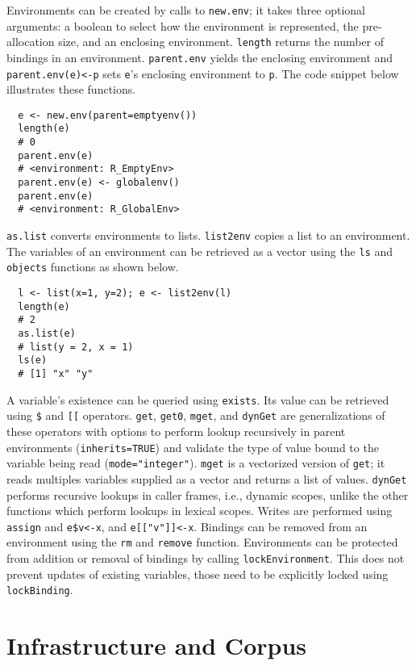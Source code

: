 \documentclass[10pt,sigplan,authorversion=true]{acmart}
\renewcommand{\c}[1]{\lstinline |#1|\xspace}
\newcommand{\newEnv}{\c{new.env}}
\newcommand{\asList}{\c{as.list}}
\newcommand{\listToEnv}{\c{list2env}}
\newcommand{\ls}{\c{ls}}
\newcommand{\objects}{\c{objects}}
\newcommand{\subDollar}{\c{$}}
\newcommand{\subBracket}{\c{[[}}
\newcommand{\exist}{\c{exists}}
\newcommand{\get}{\c{get}}
\newcommand{\getZero}{\c{get0}}
\newcommand{\mget}{\c{mget}}
\newcommand{\dynGet}{\c{dynGet}}
\newcommand{\assign}{\c{assign}}
\newcommand{\remove}{\c{remove}}
\renewcommand{\rm}{\c{rm}}
\newcommand{\lockEnvironment}{\c{lockEnvironment}}
\newcommand{\lockBinding}{\c{lockBinding}}
\newcommand{\parentEnv}{\c{parent.env}}
\begin{document}
Environments can be created by calls to \newEnv; it takes three optional
arguments: a boolean to select how the environment is represented, the
pre-allocation size, and an enclosing environment. \c{length} returns the number
of bindings in an environment. \parentEnv yields the enclosing environment and
\c{parent.env(e)<-p} sets {\small\tt e}'s enclosing environment to \c{p}. The
code snippet below illustrates these functions.

\begin{lstlisting}
  e <- new.env(parent=emptyenv())
  length(e)
  # 0
  parent.env(e)
  # <environment: R_EmptyEnv>
  parent.env(e) <- globalenv()
  parent.env(e)
  # <environment: R_GlobalEnv>
\end{lstlisting}

\noindent
\asList converts environments to lists. \listToEnv copies a list to an
environment. The variables of an environment can be retrieved as a vector using
the \ls and \objects functions as shown below.

\begin{lstlisting}
  l <- list(x=1, y=2); e <- list2env(l)
  length(e)
  # 2
  as.list(e)
  # list(y = 2, x = 1)
  ls(e)
  # [1] "x" "y"
\end{lstlisting}

\noindent
A variable's existence can be queried using \exist. Its value can be retrieved
using \subDollar and \subBracket operators. \get, \getZero, \mget, and \dynGet
are generalizations of these operators with options to perform lookup
recursively in parent environments (\c{inherits=TRUE}) and validate the type of
value bound to the variable being read (\c{mode="integer"}). \mget is a
vectorized version of \get; it reads multiples variables supplied as a vector
and returns a list of values. \dynGet performs recursive lookups in caller
frames, i.e., dynamic scopes, unlike the other functions which perform lookups
in lexical scopes. Writes are performed using \assign and \c{e$v<-x}, and
\c{e[["v"]]<-x}. Bindings can be removed from an environment using the \rm and
\remove function.
Environments can be protected from addition or removal of bindings by calling
\lockEnvironment. This does not prevent updates of existing variables, those
need to be explicitly locked using \lockBinding.


\section{Infrastructure and Corpus}
\end{document}
